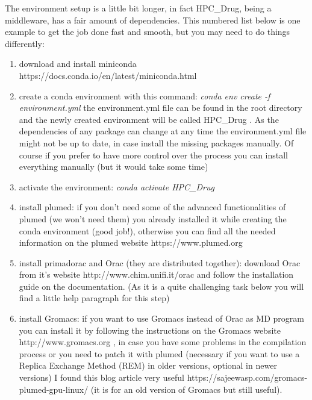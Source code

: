 	The environment setup is a little bit longer, in fact HPC\_Drug, being a middleware, has a fair amount of dependencies. This numbered list below is one example to get the job done fast and smooth, but you may need to do things differently:
	\begin{enumerate}
		\item download and install miniconda https://docs.conda.io/en/latest/miniconda.html
		
		\item create a conda environment with this command: \emph{conda env create -f environment.yml} the environment.yml file can be found in the root directory and the newly created environment will be called HPC\_Drug . As the dependencies of any package can change at any time the environment.yml file might not be up to date, in case install the missing packages manually. Of course if you prefer to have more control over the process you can install everything manually (but it would take some time)
		
		\item activate the environment: \emph{conda activate HPC\_Drug}
		
		\item install plumed\cite{plumed}: if you don't need some of the advanced functionalities of plumed (we won't need them) you already installed it while creating the conda environment (good job!), otherwise you can find all the needed information on the plumed website https://www.plumed.org
		
		\item install primadorac\cite{primadorac} and Orac\cite{orac} (they are distributed together): download Orac from it's website http://www.chim.unifi.it/orac and follow the installation guide on the documentation. (As it is a quite challenging task below you will find a little help paragraph for this step)
		
		\item install Gromacs\cite{gromacs_ABRAHAM201519}: if you want to use Gromacs instead of Orac as MD program you can install it by following the instructions on the Gromacs website http://www.gromacs.org , in case you have some problems in the compilation process or you need to patch it with plumed (necessary if you want to use a Replica Exchange Method (REM) in older versions, optional in newer versions) I found this blog article very useful https://sajeewasp.com/gromacs-plumed-gpu-linux/ (it is for an old version of Gromacs but still useful).
	\end{enumerate}

